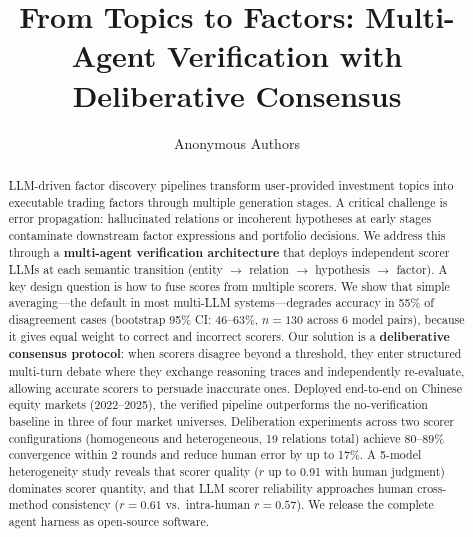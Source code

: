 \documentclass[sigconf]{acmart}
\begin{document}
\title{From Topics to Factors: Multi-Agent Verification with Deliberative Consensus}

\author{Anonymous Authors}

\begin{abstract}
LLM-driven factor discovery pipelines transform user-provided investment topics into executable trading factors through multiple generation stages. A critical challenge is error propagation: hallucinated relations or incoherent hypotheses at early stages contaminate downstream factor expressions and portfolio decisions. We address this through a \textbf{multi-agent verification architecture} that deploys independent scorer LLMs at each semantic transition (entity $\rightarrow$ relation $\rightarrow$ hypothesis $\rightarrow$ factor). A key design question is how to fuse scores from multiple scorers. We show that simple averaging---the default in most multi-LLM systems---degrades accuracy in 55\% of disagreement cases (bootstrap 95\% CI: 46--63\%, $n{=}130$ across 6 model pairs), because it gives equal weight to correct and incorrect scorers. Our solution is a \textbf{deliberative consensus protocol}: when scorers disagree beyond a threshold, they enter structured multi-turn debate where they exchange reasoning traces and independently re-evaluate, allowing accurate scorers to persuade inaccurate ones. Deployed end-to-end on Chinese equity markets (2022--2025), the verified pipeline outperforms the no-verification baseline in three of four market universes. Deliberation experiments across two scorer configurations (homogeneous and heterogeneous, 19 relations total) achieve 80--89\% convergence within 2 rounds and reduce human error by up to 17\%. A 5-model heterogeneity study reveals that scorer quality ($r$ up to 0.91 with human judgment) dominates scorer quantity, and that LLM scorer reliability approaches human cross-method consistency ($r{=}0.61$ vs.\ intra-human $r{=}0.57$). We release the complete agent harness as open-source software.
\end{abstract}


\maketitle
\end{document}
